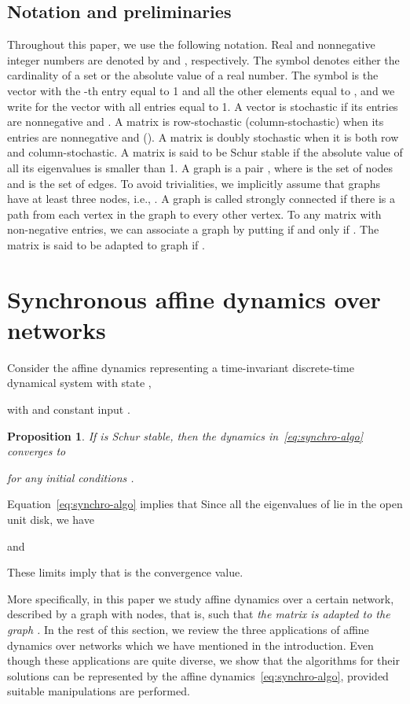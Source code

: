 \documentclass{IEEEtran}
\newtheorem{proposition}{Proposition}
\newcommand{\1}{\mathbf{1}} \newcommand{\ind}{\mathds{1}}
\begin{document}
\subsection{Notation and preliminaries}
Throughout this paper, we use the following notation. 
Real and nonnegative integer numbers are denoted by  and , respectively. 
The symbol  denotes either the cardinality of a set or the absolute value of a real number.
The symbol  is the vector with the -th entry equal to 1 and all the other elements equal to , and we write  for the vector with all entries equal to 1. A vector  is stochastic if its entries are nonnegative and .
A matrix  is row-stochastic (column-stochastic) when its entries are nonnegative and  (). A matrix is doubly stochastic when it is both row and column-stochastic. A matrix  is said to be Schur stable if the absolute value of all its eigenvalues is smaller than 1. A graph is a pair , where  is the set of nodes and  is the set of edges. 
To avoid trivialities, we implicitly assume that graphs have at least three nodes, i.e., .
A graph  is called strongly connected if there is a path from each vertex in the graph to every other vertex.
To any matrix  with non-negative entries, we can associate a graph  by putting  if and only if . The matrix  is said to be adapted to graph  if .


 

\section{Synchronous affine dynamics over networks}\label{sect:synchro}
Consider the affine dynamics representing  a time-invariant discrete-time dynamical system with state , 

with  and constant input . 




\begin{proposition}
\label{prop:synch-converge}
If  is Schur stable, then the dynamics in~\eqref{eq:synchro-algo} converges to 

for any initial conditions .
\end{proposition}
\begin{IEEEproof}
Equation~\eqref{eq:synchro-algo} implies that
 Since all the eigenvalues of  lie in the open unit disk, we have
  
and 
 
These limits imply that  is the convergence value. 
\end{IEEEproof}

More specifically, in this paper we study affine dynamics over a certain network, described by a graph  with  nodes, that is, such that {\em the matrix  is adapted to the graph .}
In the rest of this section, we review the three applications of affine dynamics over networks which we have mentioned in the introduction. Even though these applications are quite diverse, we show that the algorithms for their solutions can be represented by the affine dynamics~\eqref{eq:synchro-algo}, provided suitable manipulations are performed.
\end{document}
